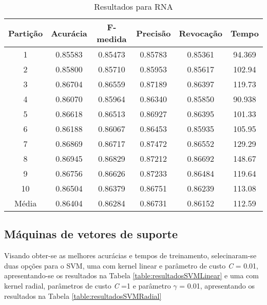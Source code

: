 	
\begin{table}[h]
\centering
\caption{Resultados para RNA}
\vspace{0.2cm}
\begin{tabular}{c|c|c|c|c|c}
Partição & Acurácia & F-medida & Precisão & Revocação & Tempo \\
\hline
1  & 0.85583 & 0.85473 & 0.85783 & 0.85361 & 94.369 \\
2  & 0.85800 & 0.85710 & 0.85953 & 0.85617 & 102.94 \\
3  & 0.86704 & 0.86559 & 0.87189 & 0.86397 & 119.73 \\
4  & 0.86070 & 0.85964 & 0.86340 & 0.85850 & 90.938 \\
5  & 0.86618 & 0.86513 & 0.86927 & 0.86395 & 101.33 \\
6  & 0.86188 & 0.86067 & 0.86453 & 0.85935 & 105.95 \\
7  & 0.86869 & 0.86717 & 0.87472 & 0.86552 & 129.29 \\
8  & 0.86945 & 0.86829 & 0.87212 & 0.86692 & 148.67 \\
9  & 0.86756 & 0.86626 & 0.87233 & 0.86484 & 119.64 \\
10 & 0.86504 & 0.86379 & 0.86751 & 0.86239 & 113.08 \\
\hline
Média & 0.86404 & 0.86284 & 0.86731 & 0.86152 & 112.59 \\
\end{tabular} 
\label{table:resultadosRNA}
\end{table}

\subsection{Máquinas de vetores de suporte}

Visando obter-se as melhores acurácias e tempos de treinamento, selecinaram-se duas opções para o SVM, uma com kernel linear e parâmetro de custo \emph{C} = 0.01, apresentando-se os resultados na Tabela \ref{table:resultadosSVMLinear} e uma com kernel radial, parâmetros de custo \emph{C} =1 e parâmetro \(\gamma\) = 0.01, apresentando os resultados na Tabela \ref{table:resultadosSVMRadial}


